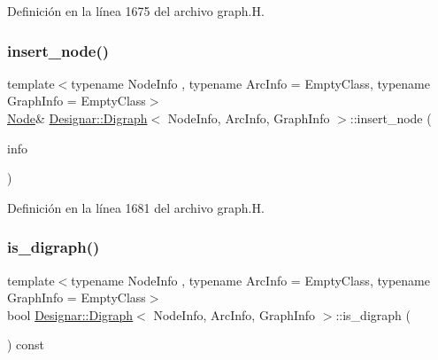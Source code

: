 Definición en la línea 1675 del archivo graph.\+H.

\mbox{\label{class_designar_1_1_digraph_a6b099922c3891b2c9fce75ffeedba025}} 
\subsubsection{\texorpdfstring{insert\+\_\+node()}{insert\_node()}\hspace{0.1cm}{\footnotesize\ttfamily [4/4]}}
{\footnotesize\ttfamily template$<$typename Node\+Info , typename Arc\+Info  = Empty\+Class, typename Graph\+Info  = Empty\+Class$>$ \\
\hyperlink{class_designar_1_1_digraph_a4dc921c41a480b7946a04170e997d8ae}{Node}\& \hyperlink{class_designar_1_1_digraph}{Designar\+::\+Digraph}$<$ Node\+Info, Arc\+Info, Graph\+Info $>$\+::insert\+\_\+node (\begin{DoxyParamCaption}\item[{Node\+Info \&\&}]{info }\end{DoxyParamCaption})\hspace{0.3cm}{\ttfamily [inline]}}



Definición en la línea 1681 del archivo graph.\+H.

\mbox{\label{class_designar_1_1_digraph_a6751952e13a35cf7aa452a8bb243f53d}} 
\subsubsection{\texorpdfstring{is\+\_\+digraph()}{is\_digraph()}}
{\footnotesize\ttfamily template$<$typename Node\+Info , typename Arc\+Info  = Empty\+Class, typename Graph\+Info  = Empty\+Class$>$ \\
bool \hyperlink{class_designar_1_1_digraph}{Designar\+::\+Digraph}$<$ Node\+Info, Arc\+Info, Graph\+Info $>$\+::is\+\_\+digraph (\begin{DoxyParamCaption}{ }\end{DoxyParamCaption}) const\hspace{0.3cm}{\ttfamily [inline]}}



